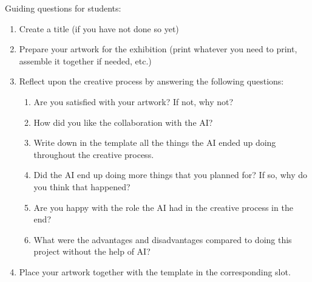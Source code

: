 \documentclass[12pt]{article}
\newcounter{question}
\begin{document}
Guiding questions for students:

\begin{enumerate}
\item Create a title (if you have not done so yet)
\item Prepare your artwork for the exhibition (print whatever you need to print, assemble it together if needed, etc.)
\item Reflect upon the creative process by answering the following questions:
\begin{enumerate}
\item Are you satisfied with your artwork? If not, why not?
\item How did you like the collaboration with the AI? 
\item Write down in the template all the things the AI ended up doing throughout the creative process.
\item Did the AI end up doing more things that you planned for? If so, why do you think that happened?
\item Are you happy with the role the AI had in the creative process in the end?
\item What were the advantages and disadvantages compared to doing this project without the help of AI? 
\end{enumerate}
\item Place your artwork together with the template in the corresponding slot.

\end{enumerate}
\end{document}
